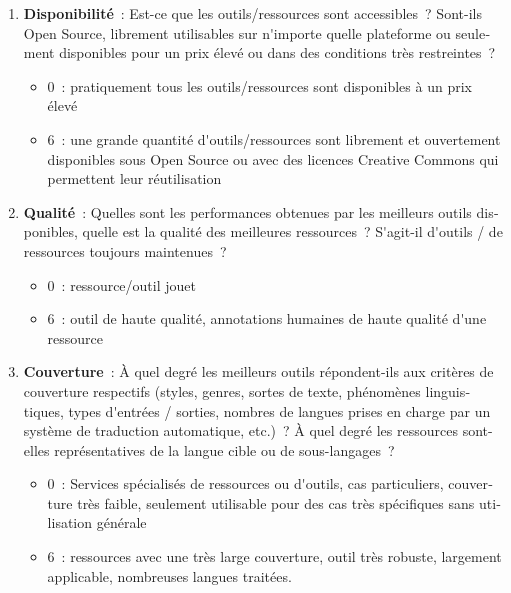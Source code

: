 \documentclass[]{../metanetpaper}
\begin{document}
\begin{french}
\begin{multicols}{2}
\begin{enumerate}
\item {\bf Disponibilité}~: Est-ce que les outils/ressources sont accessibles~? Sont-ils Open Source, librement utilisables sur n{\mbox '}importe quelle plateforme ou seulement disponibles pour un prix élevé ou dans des conditions très restreintes~?
      \begin{itemize}
      \item 0~: pratiquement tous les outils/ressources sont disponibles à un prix élevé
      \item 6~: une grande quantité d{\mbox '}outils/ressources sont librement et ouvertement disponibles sous Open Source ou avec des licences Creative Commons qui permettent leur réutilisation
      \end{itemize}

\item {\bf Qualité}~: Quelles sont les performances obtenues par les meilleurs outils disponibles, quelle est la qualité des meilleures ressources~? S{\mbox '}agit-il d{\mbox '}outils / de ressources toujours maintenues~? 
      \begin{itemize}
      \item 0~: ressource/outil jouet
      \item 6~: outil de haute qualité, annotations humaines de haute qualité d{\mbox '}une ressource 
      \end{itemize}

\item {\bf Couverture}~: À quel degré les meilleurs outils répondent-ils aux critères de couverture respectifs (styles, genres, sortes de texte, phénomènes linguistiques, types d{\mbox '}entrées / sorties, nombres de langues prises en charge par un système de traduction automatique, etc.)~? À quel degré les ressources sont-elles représentatives de la langue cible ou de sous-langages~? 
      \begin{itemize}
      \item 0~: Services spécialisés de ressources ou d{\mbox '}outils, cas particuliers, couverture très faible, seulement utilisable pour des cas très spécifiques sans utilisation générale
      \item 6~: ressources avec une très large couverture, outil très robuste, largement applicable, nombreuses langues traitées.
      \end{itemize}


\end{enumerate}
\end{multicols}
\end{french}
\end{document}
